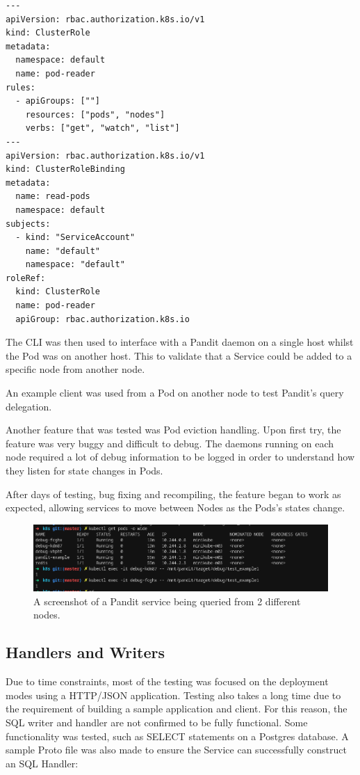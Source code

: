 \documentclass[a4paper,12pt]{report}
\begin{document}
\begin{lstlisting}
---
apiVersion: rbac.authorization.k8s.io/v1
kind: ClusterRole
metadata:
  namespace: default
  name: pod-reader
rules:
  - apiGroups: [""] 
    resources: ["pods", "nodes"]
    verbs: ["get", "watch", "list"]
---
apiVersion: rbac.authorization.k8s.io/v1
kind: ClusterRoleBinding
metadata:
  name: read-pods
  namespace: default
subjects:
  - kind: "ServiceAccount"
    name: "default"
    namespace: "default"
roleRef:
  kind: ClusterRole 
  name: pod-reader 
  apiGroup: rbac.authorization.k8s.io
\end{lstlisting}

The CLI was then used to interface with a Pandit daemon on a single host whilst the Pod was on another host. This to validate that a Service could be added to a specific node from another node.

An example client was used from a Pod on another node to test Pandit's query delegation. 

Another feature that was tested was Pod eviction handling. Upon first try, the feature was very buggy and difficult to debug. The daemons running on each node required a lot of debug information to be logged in order to understand how they listen for state changes in Pods.

After days of testing, bug fixing and recompiling, the feature began to work as expected, allowing services to move between Nodes as the Pods's states change.

\begin{figure}[hbt!]
    \centering
    \includegraphics[width=\linewidth]{k8s_eg.png}
    \caption{A screenshot of a Pandit service being queried from 2 different nodes.}
\end{figure}

\subsection{Handlers and Writers}

Due to time constraints, most of the testing was focused on the deployment modes using a HTTP/JSON application.
Testing also takes a long time due to the requirement of building a sample application and client.
For this reason, the SQL writer and handler are not confirmed to be fully functional. Some functionality was tested, such as 
SELECT statements on a Postgres database. A sample Proto file was also made to ensure the Service can successfully construct an SQL Handler:
\end{document}

